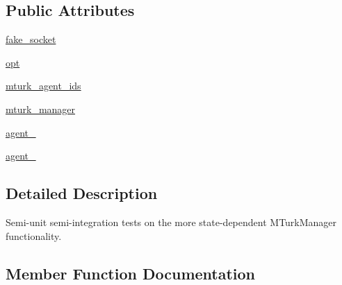 \subsection*{Public Attributes}
\begin{DoxyCompactItemize}
\item 
\hyperlink{classparlai_1_1mturk_1_1core_1_1test_1_1test__mturk__manager_1_1TestMTurkManagerConnectedFunctions_a3dfd420df777d0308e0e625311a66b2b}{fake\+\_\+socket}
\item 
\hyperlink{classparlai_1_1mturk_1_1core_1_1test_1_1test__mturk__manager_1_1TestMTurkManagerConnectedFunctions_ab80d83712b2d7749f214e9732d62a886}{opt}
\item 
\hyperlink{classparlai_1_1mturk_1_1core_1_1test_1_1test__mturk__manager_1_1TestMTurkManagerConnectedFunctions_a2f9acd81ce0c81968cad27572cf6d204}{mturk\+\_\+agent\+\_\+ids}
\item 
\hyperlink{classparlai_1_1mturk_1_1core_1_1test_1_1test__mturk__manager_1_1TestMTurkManagerConnectedFunctions_a38b88396cc47e219b066ea3ae3e7adf1}{mturk\+\_\+manager}
\item 
\hyperlink{classparlai_1_1mturk_1_1core_1_1test_1_1test__mturk__manager_1_1TestMTurkManagerConnectedFunctions_a5ea436b204f4d8f9d1033f3b6b386c8f}{agent\+\_}
\item 
\hyperlink{classparlai_1_1mturk_1_1core_1_1test_1_1test__mturk__manager_1_1TestMTurkManagerConnectedFunctions_a090084d206eee145ed6c0e7f10ce503c}{agent\+\_}
\end{DoxyCompactItemize}


\subsection{Detailed Description}
\begin{DoxyVerb}Semi-unit semi-integration tests on the more state-dependent MTurkManager
functionality.
\end{DoxyVerb}
 

\subsection{Member Function Documentation}
\mbox{\label{classparlai_1_1mturk_1_1core_1_1test_1_1test__mturk__manager_1_1TestMTurkManagerConnectedFunctions_af2e2774f637d81a8bfe1df5ec9e884ad}} 
